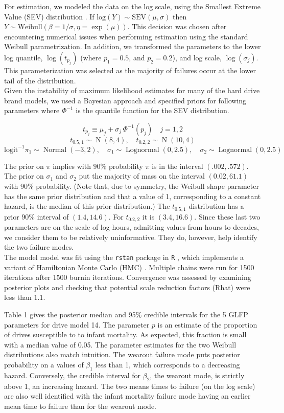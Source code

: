 \documentclass[12pt]{article}
\newcommand{\op}{\operatorname}
\begin{document}
For estimation, we modeled the data on the log scale, using the Smallest Extreme Value (SEV) distribution \cite{meeker}.  If $\text{log}(Y) \sim \text{SEV}(\mu, \sigma)$ then $Y \sim \text{Weibull}(\beta = 1/\sigma, \eta = \exp(\mu))$.  This decision was chosen after encountering numerical issues when performing estimation using the standard Weibull parametrization.  In addition, we transformed the parameters to the lower log quantile, $\log(t_{p_j})$ (where $p_{1} = 0.5$, and $p_2 = 0.2$), and log scale, $\log(\sigma_j)$.  This parameterization was selected as the majority of failures occur at the lower tail of the distribution.  \\

Given the instability of maximum likelihood estimates for many of the hard drive brand models, we used a Bayesian approach and specified priors for following parameters where $\Phi^{-1}$ is the quantile function for the SEV distribution.

$$t_{p_j} \equiv \mu_{j} + \sigma_{j}\,\Phi^{-1}(p_j) \quad j=1,2$$
$$t_{0.5,1} \sim \op{N}(8,4), \quad t_{0.2,2} \sim \op{N}(10,4)$$
$$\mbox{logit}^{-1}\pi_1 \sim \op{Normal}(-3,2),\quad \sigma_1 \sim \op{Lognormal}(0, 2.5), \quad \sigma_2 \sim \op{Lognormal}(0, 2.5) $$

The prior on $\pi$ implies with $90\%$ probability $\pi$ is in the interval $(.002, .572)$. The prior on $\sigma_1$ and $\sigma_2$ put the majority of mass on the interval $(0.02, 61.1)$ with $90\%$ probability. (Note that, due to symmetry, the Weibull shape parameter has the same prior distribution and that a value of 1, corresponding to a constant hazard, is the median of this prior distribution.) The $t_{0.5,1}$ distribution has a prior $90\%$ interval of $(1.4,14.6)$. For $t_{0.2,2}$ it is $(3.4,16.6)$. Since these last two parameters are on the scale of log-hours, admitting values from hours to decades, we consider them to be relatively uninformative.  They do, however, help identify the two failure modes. \\

The model model was fit using the {\tt rstan}\cite{rstan} package in {\tt R} \cite{r}, which implements a variant of Hamiltonian Monte Carlo (HMC) \cite{betancourt}. Multiple chains were run for 1500 iterations after 1500 burnin iterations. Convergence was assessed by examining posterior plots and checking that potential scale reduction factors (Rhat) \cite{gelman2014bayesian} were less than $1.1$.

Table 1 gives the posterior median and 95\% credible intervals for the 5 GLFP parameters for drive model 14.  The parameter $p$ is an estimate of the proportion of drives susceptible to to infant mortality.  As expected, this fraction is small with a median value of 0.05.  The parameter estimates for the two Weibull distributions also match intuition.  The wearout failure mode puts posterior probability on a values of $\beta_1$ less than 1, which corresponds to a decreasing hazard.  Conversely, the credible interval for $\beta_2$, the wearout mode, is strictly above 1, an increasing hazard.  The two means times to failure (on the log scale) are also well identified with the infant mortality failure mode having an earlier mean time to failure than for the wearout mode. 
\end{document}
